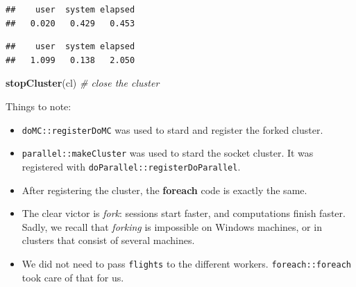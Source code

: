 \documentclass[]{book}
\newenvironment{Shaded}{\begin{snugshade}}{\end{snugshade}}
\newcommand{\CommentTok}[1]{\textcolor[rgb]{0.56,0.35,0.01}{\textit{#1}}}
\newcommand{\DataTypeTok}[1]{\textcolor[rgb]{0.13,0.29,0.53}{#1}}
\newcommand{\DecValTok}[1]{\textcolor[rgb]{0.00,0.00,0.81}{#1}}
\newcommand{\KeywordTok}[1]{\textcolor[rgb]{0.13,0.29,0.53}{\textbf{#1}}}
\newcommand{\NormalTok}[1]{#1}
\newcommand{\OperatorTok}[1]{\textcolor[rgb]{0.81,0.36,0.00}{\textbf{#1}}}
\newcommand{\StringTok}[1]{\textcolor[rgb]{0.31,0.60,0.02}{#1}}
\providecommand{\tightlist}{%
  \setlength{\itemsep}{0pt}\setlength{\parskip}{0pt}}
\theoremstyle{definition}
\theoremstyle{definition}
\theoremstyle{definition}
\theoremstyle{remark}
\begin{document}
\begin{verbatim}
##    user  system elapsed 
##   0.020   0.429   0.453
\end{verbatim}

\begin{Shaded}
\end{Shaded}

\begin{verbatim}
##    user  system elapsed 
##   1.099   0.138   2.050
\end{verbatim}

\begin{Shaded}
\begin{Highlighting}[]
\KeywordTok{stopCluster}\NormalTok{(cl) }\CommentTok{# close the cluster}
\end{Highlighting}
\end{Shaded}

Things to note:

\begin{itemize}
\tightlist
\item
  \texttt{doMC::registerDoMC} was used to stard and register the forked cluster.
\item
  \texttt{parallel::makeCluster} was used to stard the socket cluster. It was registered with \texttt{doParallel::registerDoParallel}.
\item
  After registering the cluster, the \textbf{foreach} code is exactly the same.
\item
  The clear victor is \emph{fork}: sessions start faster, and computations finish faster. Sadly, we recall that \emph{forking} is impossible on Windows machines, or in clusters that consist of several machines.
\item
  We did not need to pass \texttt{flights} to the different workers. \texttt{foreach::foreach} took care of that for us.
\end{itemize}
\end{document}
